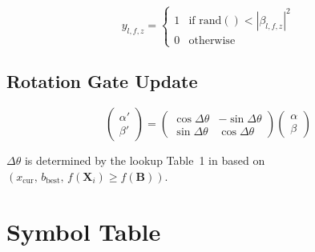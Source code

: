 \documentclass[11pt,a4paper]{article}
\begin{document}
\begin{equation}
  y_{l,f,z} = \begin{cases} 1 & \text{if } \mathrm{rand}() < |\beta_{l,f,z}|^2 \\ 0 & \text{otherwise} \end{cases}
  \tag{Xie~22}
\end{equation}

\subsection{Rotation Gate Update}

\begin{equation}
  \begin{pmatrix} \alpha' \\ \beta' \end{pmatrix}
  = \begin{pmatrix} \cos\Delta\theta & -\sin\Delta\theta \\
                    \sin\Delta\theta &  \cos\Delta\theta \end{pmatrix}
  \begin{pmatrix} \alpha \\ \beta \end{pmatrix}
  \tag{Xie~23--24}
\end{equation}

\noindent $\Delta\theta$ is determined by the lookup Table~1 in \cite{Xie} based on
$(x_{\mathrm{cur}},\, b_{\mathrm{best}},\, f(\mathbf{X}_i) \geq f(\mathbf{B}))$.

\section*{Symbol Table}
\end{document}
